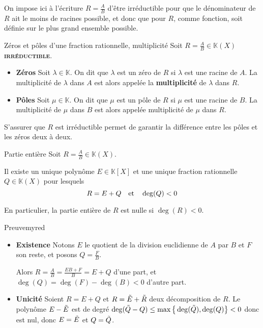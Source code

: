     On impose ici à l’écriture $R = \frac{A}{B}$ d’être irréductible pour que le dénominateur de $R$ ait le moins de racines possible, et donc que pour $R$, comme fonction, soit définie sur le plus grand ensemble possible. 

    \begin{defi}{Zéros et pôles d’une fraction rationnelle, multiplicité}{}
        Soit $R = \frac{A}{B} \in \mathbb{K}(X)$ \textbf{\textsc{irréductible}}.
        \begin{itemize}
            \item \textbf{Zéros} \quad Soit $\lambda \in \mathbb{K}$. On dit que $\lambda$ est un zéro de $R$ si $\lambda$ est une racine de $A$. La multiplicité de $\lambda$ dans $A$ est alors appelée la \textbf{multiplicité} de $\lambda$ dans $R$.
            \item \textbf{Pôles} \quad Soit $\mu \in \mathbb{K}$. On dit que $\mu$ est un pôle de $R$ si $\mu$ est une racine de $B$. La multiplicité de $\mu$ dans $B$ est alors appelée multiplicité de $\mu$ dans $R$. 
        \end{itemize}
    \end{defi}

    S’assurer que $R$ est irréductible permet de garantir la différence entre les pôles et les zéros deux à deux.

    \begin{theo}{Partie entière}{}
        Soit $R = \frac{A}{B} \in \mathbb{K}(X)$.

        Il existe un unique polynôme $E \in \mathbb{K}[X]$ et une unique fraction rationnelle $Q \in \mathbb{K}(X)$ pour lesquels 
        \[ R = E + Q \quad \text{et} \quad \deg(Q) < 0  \]    
    \end{theo}

    En particulier, la partie entière de $R$ est nulle si $\deg(R) < 0$.

    \begin{demo}{Preuve}{myred}
        \begin{itemize}
            \item \textbf{Existence} \quad Notons $E$ le quotient de la division euclidienne de $A$ par $B$ et $F$ son reste, et posons $Q = \frac{F}{B}$.
            
            Alors $R = \frac{A}{B} = \frac{EB + F}{B} = E + Q$ d’une part, et $\deg(Q) = \deg(F) - \deg(B) < 0$ d’autre part.
            \item \textbf{Unicité} \quad Soient $R = E + Q$ et $R = \Tilde{E} + \Tilde{R}$ deux décomposition de $R$. Le polynôme $E - \Tilde{E}$ est de degré $\deg(\Tilde{Q} - Q) \leq \max\big\{ \deg(\Tilde{Q}), \deg(Q) \big\} < 0$ donc est nul, donc $E = \Tilde{E}$ et $Q = \Tilde{Q}$.
        \end{itemize}
    \end{demo}

